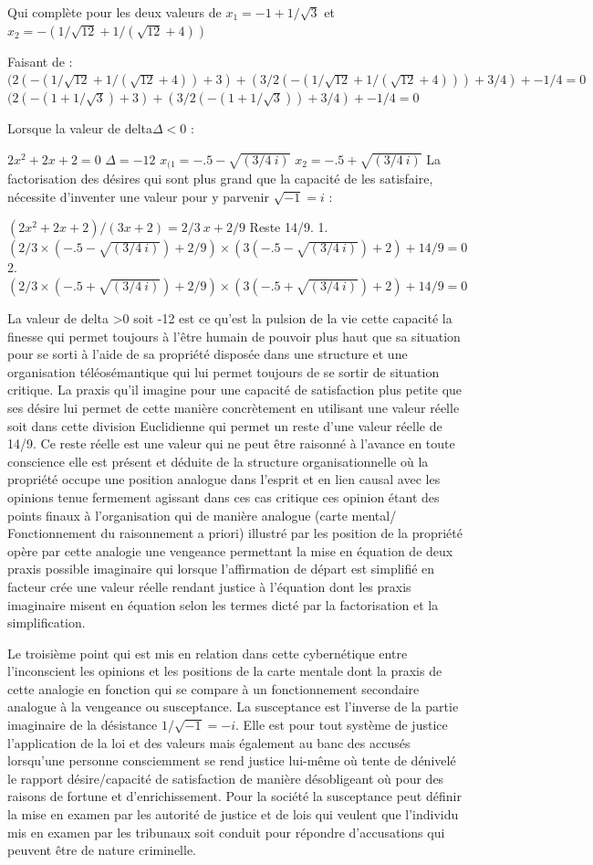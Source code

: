\documentclass[12pt,a4paper]{article}
\begin{document}
Qui complète pour les deux valeurs de $x_1=-1+1/\sqrt{3}$  et $x_2=-(1/\sqrt{12}+1/(\sqrt{12}+4))$

Faisant de :
$(2(-(1/\sqrt{12}+1/(\sqrt{12}+4))+3)+(3/2(-(1/\sqrt{12}+1/(\sqrt{12}+4)))+3/4)+-1/4=0$
$(2(-(1+1/\sqrt{3})+3)+(3/2(-(1+1/\sqrt{3}))+3/4)+-1/4=0$

Lorsque la valeur de delta$\Delta<0$ :

$2x^2+2x+2=0$
$\Delta=-12$
$x_{(1}=-.5-\sqrt{(3/4\ i)}$
$x_2=-.5+\sqrt{(3/4\ i)}$
La factorisation des désires qui sont plus grand que la capacité de les satisfaire, nécessite d’inventer une valeur pour y parvenir $\sqrt{-1}=i$ :

$(2x^2+2x+2)/(3x+2)=2/3\ x+2/9$  Reste 14/9.
1.$(2/3\times(-.5-\sqrt{(3/4\ i)})+2/9)\times(3(-.5-\sqrt{(3/4\ i)})+2)+14/9=0$
2.$(2/3\times(-.5+\sqrt{(3/4\ i)})+2/9)\times(3(-.5+\sqrt{(3/4\ i)})+2)+14/9=0$

La valeur de delta >0 soit -12 est ce qu’est la pulsion de la vie cette capacité la finesse qui permet toujours à l’être humain de pouvoir plus haut que sa situation pour se sorti à l’aide de sa propriété disposée dans une structure et une organisation téléosémantique qui lui permet toujours de se sortir de situation critique. La praxis qu’il imagine pour une capacité de satisfaction plus petite que ses désire lui permet de cette manière concrètement en utilisant une valeur réelle soit dans cette division Euclidienne qui permet un reste d’une valeur réelle de 14/9. Ce reste réelle est une valeur qui ne peut être raisonné à l’avance en toute conscience elle est présent et déduite de la structure organisationnelle  où la propriété occupe une position analogue dans l’esprit et en lien causal avec les opinions tenue fermement agissant dans ces cas critique ces opinion étant des points finaux à l’organisation qui de manière analogue (carte mental/ Fonctionnement du raisonnement a priori) illustré par les position de la propriété opère par cette analogie une vengeance permettant la mise en équation de deux praxis possible imaginaire qui lorsque l’affirmation de départ est simplifié en facteur crée une valeur réelle rendant justice à l’équation dont les praxis imaginaire misent en équation selon les termes dicté par la factorisation et la simplification.

Le troisième point qui est mis en relation dans cette cybernétique entre l’inconscient les opinions et les positions de la carte mentale dont la praxis de cette analogie en fonction qui se compare à un fonctionnement secondaire analogue à la vengeance ou susceptance. La susceptance est l’inverse de la partie imaginaire de la désistance $1/\sqrt{-1}=-i$. Elle est pour tout système de justice l’application de la loi et des valeurs mais également au banc des accusés lorsqu’une personne consciemment se rend justice lui-même où tente de dénivelé le rapport désire/capacité de satisfaction de manière désobligeant où pour des raisons de fortune et d’enrichissement. Pour la société la susceptance peut définir la mise en examen par les autorité de justice et de lois qui veulent que l’individu mis en examen par les tribunaux soit conduit pour répondre d’accusations qui peuvent être de nature criminelle.
\end{document}
